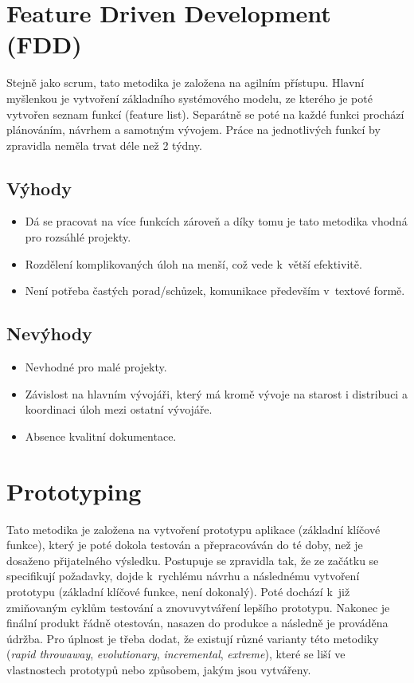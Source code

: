 \documentclass[thesis=M,czech]{FITthesis}[2019/12/23]
\begin{document}
\section{Feature Driven Development (FDD) \cite{fdd}}
Stejně jako scrum, tato metodika je založena na agilním přístupu. Hlavní myšlenkou je vytvoření základního systémového modelu, ze kterého je poté vytvořen seznam funkcí (feature list). Separátně se poté na každé funkci prochází plánováním, návrhem a samotným vývojem. Práce na jednotlivých funkcí by zpravidla neměla trvat déle než 2 týdny.

\subsection*{Výhody}
\begin{itemize}
    \item Dá se pracovat na více funkcích zároveň a díky tomu je tato metodika vhodná pro rozsáhlé projekty.
    \item Rozdělení komplikovaných úloh na menší, což vede k~větší efektivitě.
    \item Není potřeba častých porad/schůzek, komunikace především v~textové formě.
\end{itemize}

\subsection*{Nevýhody}
\begin{itemize}
    \item Nevhodné pro malé projekty.
    \item Závislost na hlavním vývojáři, který má kromě vývoje na starost i distribuci a koordinaci úloh mezi ostatní vývojáře.
    \item Absence kvalitní dokumentace.
\end{itemize}

\section{Prototyping \cite{prototyping}}
Tato metodika je založena na vytvoření prototypu aplikace (základní klíčové funkce), který je poté dokola testován a přepracováván do té doby, než je dosaženo přijatelného výsledku. Postupuje se zpravidla tak, že ze začátku se specifikují požadavky, dojde k~rychlému návrhu a následnému vytvoření prototypu (základní klíčové funkce, není dokonalý). Poté dochází k~již zmiňovaným cyklům testování a znovuvytváření lepšího prototypu. Nakonec je finální produkt řádně otestován, nasazen do produkce a následně je prováděna údržba. Pro úplnost je třeba dodat, že existují různé varianty této metodiky (\textit{rapid throwaway}, \textit{evolutionary}, \textit{incremental}, \textit{extreme}), které se liší ve vlastnostech prototypů nebo způsobem, jakým jsou vytvářeny.
\end{document}
